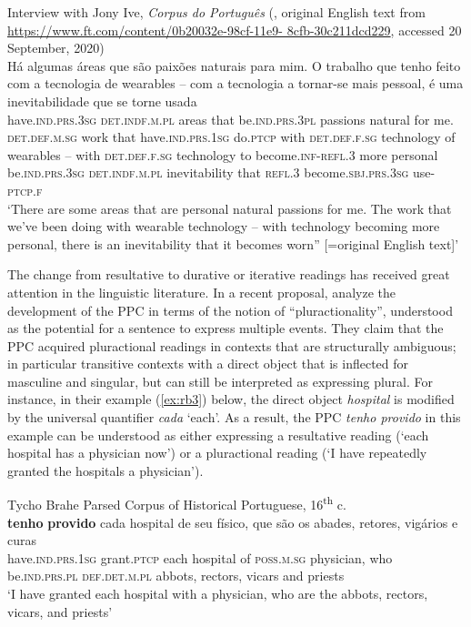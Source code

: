 \documentclass[output=paper,colorlinks,citecolor=brown]{langscibook}
\begin{document}
\ea\label{ex:rb2}
Interview with Jony Ive, \textit{Corpus do Português} (\citealt{Davies2016P}, original English text from \href{https://www.ft.com/content/0b20032e-98cf-11e9-8cfb-30c211dcd229}{https://www.ft.com/content/0b20032e-98cf-11e9- 8cfb-30c211dcd229}, accessed 20 September, 2020)\\
\gll Há algumas áreas que são paixões naturais para mim. O trabalho que tenho feito com a tecnologia de wearables – com a tecnologia a tornar-se mais pessoal, é uma inevitabilidade que se torne usada \\
have.\textsc{ind.prs.3sg} \textsc{det.indf.m.pl} areas that be.\textsc{ind.prs.3pl} passions natural for me. \textsc{det.def.m.sg} work that have.\textsc{ind.prs.1sg} do.\textsc{ptcp} with \textsc{det.def.f.sg} technology of wearables – with \textsc{det.def.f.sg} technology to become.\textsc{inf-refl.3} more personal be.\textsc{ind.prs.3sg} \textsc{det.indf.m.pl} inevitability that \textsc{refl.3} become.\textsc{sbj.prs.3sg} use-\textsc{ptcp.f}\\
\glt ‘There are some areas that are personal natural passions for me. The work that we’ve been doing with wearable technology – with technology becoming more personal, there is an inevitability that it becomes worn” [=original English text]’
\z

The change from resultative to durative or iterative readings has received great attention in the linguistic literature. In a recent proposal, \citet{AmaralHowe2012} analyze the development of the PPC in terms of the notion of “pluractionality”, understood as the potential for a sentence to express multiple events. They claim that the PPC acquired pluractional readings in contexts that are structurally ambiguous; in particular transitive contexts with a direct object that is inflected for masculine and singular, but can still be interpreted as expressing plural. For instance, in their example (\ref{ex:rb3}) below, the direct object \textit{hospital} is modified by the universal quantifier \textit{cada} ‘each’. As a result, the PPC \textit{tenho provido} in this example can be understood as either expressing a resultative reading (‘each hospital has a physician now’) or a pluractional reading (‘I have repeatedly granted the hospitals a physician’).

\ea\label{ex:rb3}
Tycho Brahe Parsed Corpus of Historical Portuguese, 16\textsuperscript{th} c. \citep[43]{AmaralHowe2012}\\
\gll \textbf{tenho} \textbf{provido} cada hospital de seu físico, que são os abades, retores, vigários e curas \\
have.\textsc{ind.prs.1sg} grant.\textsc{ptcp} each hospital of \textsc{poss.m.sg} physician, who be.\textsc{ind.prs.pl} \textsc{def.det.m.pl} abbots, rectors, vicars and priests\\
\glt ‘I have granted each hospital with a physician, who are the abbots, rectors, vicars, and priests’
\z
\end{document}
